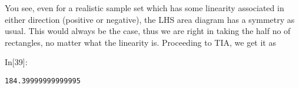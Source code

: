 \documentclass[float=false,crop=false]{standalone}
\begin{document}
    You see, even for a realistic sample set which has some linearity
associated in either direction (positive or negative), the LHS area
diagram has a symmetry as usual. This would always be the case, thus we
are right in taking the half no of rectangles, no matter what the
linearity is. Proceeding to TIA, we get it as
\begin{InVerbatim}[commandchars=\\\{\},fontsize=\scriptsize]
{\color{incolor}In[{\color{incolor}39}]:}     \PY{p}{[}       \PY{p}{]}\PY{p}{[}         \PY{p}{]}
\end{InVerbatim}
    \begin{Verbatim}[commandchars=\\\{\},fontsize=\footnotesize]
184.39999999999995

    \end{Verbatim}


    
    
    
    
\end{document}
